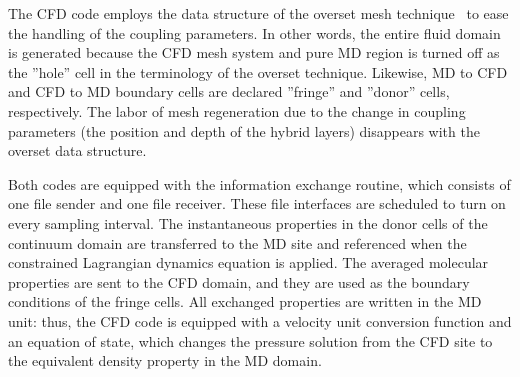 \documentclass[preprint,12pt]{elsarticle}
\begin{document}
The CFD code employs the data structure of the overset mesh technique~\cite{Chimera}  to ease the handling of the coupling parameters. In other words, the entire fluid domain is generated because the CFD mesh system and pure MD region is turned off as the ''hole'' cell in the terminology of the overset technique. Likewise, MD to CFD and CFD to MD boundary cells are declared ''fringe'' and ''donor'' cells, respectively. The labor of mesh regeneration due to the change in coupling parameters (the position and depth of the hybrid layers) disappears with the overset data structure.


Both codes are equipped with the information exchange routine, which consists of one file sender and one file receiver. These file interfaces are scheduled to turn on every sampling interval. The instantaneous properties in the donor cells of the continuum domain are transferred to the MD site and referenced when the constrained Lagrangian dynamics equation is applied. The averaged molecular properties are sent to the CFD domain, and they are used as the boundary conditions of the fringe cells. All exchanged properties are written in the MD unit: thus, the CFD code is equipped with a velocity unit conversion function and an equation of state, which changes the pressure solution from the CFD site to the equivalent density property in the MD domain.

\end{document}
